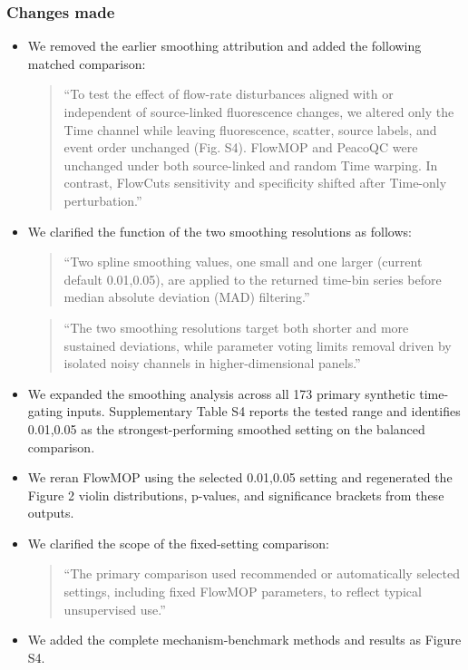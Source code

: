 \documentclass[
  11pt,
  a4paper,
]{article}
\begin{document}
\subsubsection{Changes made}\label{changes-made-3}

\begin{itemize}
\item
  We removed the earlier smoothing attribution and added the following
  matched comparison:

  \begin{quote}
  ``To test the effect of flow-rate disturbances aligned with or
  independent of source-linked fluorescence changes, we altered only the
  Time channel while leaving fluorescence, scatter, source labels, and
  event order unchanged (Fig. S4). FlowMOP and PeacoQC were unchanged
  under both source-linked and random Time warping. In contrast,
  FlowCut\textquotesingle s sensitivity and specificity shifted after
  Time-only perturbation.''
  \end{quote}
\item
  We clarified the function of the two smoothing resolutions as follows:

  \begin{quote}
  ``Two spline smoothing values, one small and one larger (current
  default 0.01,0.05), are applied to the returned time-bin series before
  median absolute deviation (MAD) filtering.''
  \end{quote}

  \begin{quote}
  ``The two smoothing resolutions target both shorter and more sustained
  deviations, while parameter voting limits removal driven by isolated
  noisy channels in higher-dimensional panels.''
  \end{quote}
\item
  We expanded the smoothing analysis across all 173 primary synthetic
  time-gating inputs. Supplementary Table S4 reports the tested range
  and identifies 0.01,0.05 as the strongest-performing smoothed setting
  on the balanced comparison.
\item
  We reran FlowMOP using the selected 0.01,0.05 setting and regenerated
  the Figure 2 violin distributions, p-values, and significance brackets
  from these outputs.
\item
  We clarified the scope of the fixed-setting comparison:

  \begin{quote}
  ``The primary comparison used recommended or automatically selected
  settings, including fixed FlowMOP parameters, to reflect typical
  unsupervised use.''
  \end{quote}
\item
  We added the complete mechanism-benchmark methods and results as
  Figure S4.
\end{itemize}
\end{document}
